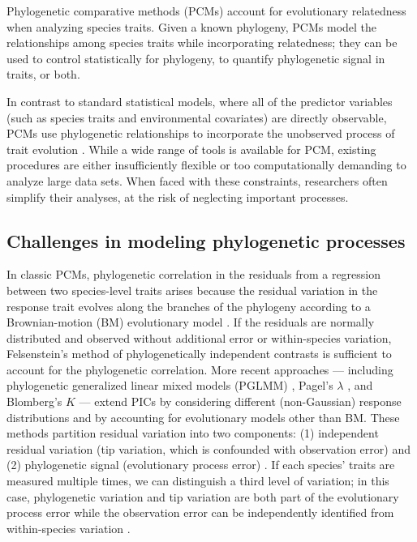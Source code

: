 \documentclass[12pt]{article}
\begin{document}
Phylogenetic comparative methods (PCMs) account for evolutionary relatedness when analyzing species traits.
Given a known phylogeny, PCMs model the relationships among species traits while incorporating relatedness; they can be used to control statistically for phylogeny, to quantify phylogenetic signal in traits, or both. 

In contrast to standard statistical models, where all of the predictor variables (such as species traits and environmental covariates) are directly observable, PCMs use phylogenetic relationships to incorporate the unobserved process of trait evolution \citep{felsenstein1985phylogenies, butler2004phylogenetic, hansen2012interpreting}. 
While a wide range of tools is available for PCM, existing procedures are either insufficiently flexible or too computationally demanding to analyze large data sets.
When faced with these constraints, researchers often simplify their analyses, at the risk of neglecting important processes.

\subsection*{Challenges in modeling phylogenetic processes}

In classic PCMs, phylogenetic correlation in the residuals from a regression between two species-level traits arises because the residual variation in the response trait evolves along the branches of the phylogeny according to a Brownian-motion (BM) evolutionary model \citep{felsenstein1985phylogenies}. 
If the residuals are normally distributed and observed without additional error or within-species variation, Felsenstein's method of phylogenetically independent contrasts  \citep[PICS:][]{felsenstein1985phylogenies} is sufficient to account for the phylogenetic correlation.
More recent approaches --- including phylogenetic generalized linear mixed models (PGLMM) \citep{ives2011generalized, housworth2004phylogenetic}, Pagel's $\lambda$ \citep{pagel1999inferring}, and Blomberg's $K$ \citep{blomberg2003testing} --- extend PICs by considering different (non-Gaussian) response distributions and by accounting for evolutionary models other than BM.
These methods partition residual variation into two components: (1) independent residual variation (tip variation, which is confounded with observation error) and (2) phylogenetic signal (evolutionary process error) \citep{hansen2012interpreting, housworth2004phylogenetic}.
If each species' traits are measured multiple times, we can distinguish a third level of variation; in this case, phylogenetic variation and tip variation are both part of the evolutionary process error while the observation error can be independently identified from within-species variation \citep{kostikova2016bridging}.
\end{document}

